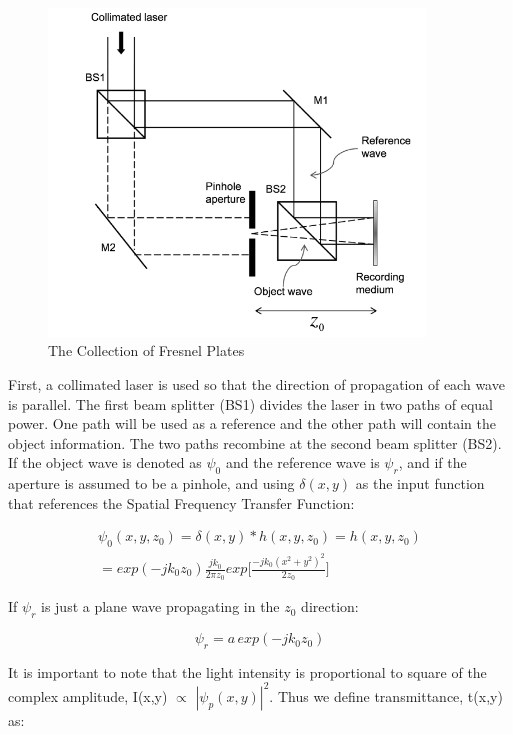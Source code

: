 \documentclass[12pt]{article}
\begin{document}
\begin{figure}
    \centering
	\includegraphics[width=100mm]{tupac7.png}
    \caption{The Collection of Fresnel Plates}
    \label{fig:Fresnel_Plates}
\end{figure}

First, a collimated laser is used so that the direction of propagation of each wave is parallel. The first beam splitter (BS1) divides the laser in two paths of equal power. One path will be used as a reference and the other path will contain the object information. The two paths recombine at the second beam splitter (BS2). If the object wave is denoted as \(\psi_{0}\) and the reference wave is \(\psi_{r}\), and if the aperture is assumed to be a pinhole, and using \(\delta(x,y)\) as the input function that references the Spatial Frequency Transfer Function:

\begin{equation}
	\begin{multlined}
		\psi_{0}(x,y,z_{0}) = \delta(x,y) * h(x,y,z_{0}) = h(x,y,z_{0})
		\\= exp(-jk_{0}z_{0})\frac{jk_{0}}{2\pi z_{0}}exp\bigg[\frac{-jk_{0}(x^2 + y^2)^2}{2z_{0}}\bigg]
	\end{multlined}
\end{equation}

If \(\psi_{r}\) is just a plane wave propagating in the \(z_{0}\) direction:

\begin{equation}
	\psi_{r} = a\,exp(-jk_{0}z_{0})
\end{equation}

It is important to note that the light intensity is proportional to square of the complex amplitude, I(x,y) \(\propto\) \(|\psi_{p}(x,y)|^2\).
Thus we define transmittance, t(x,y) as:
\end{document}
